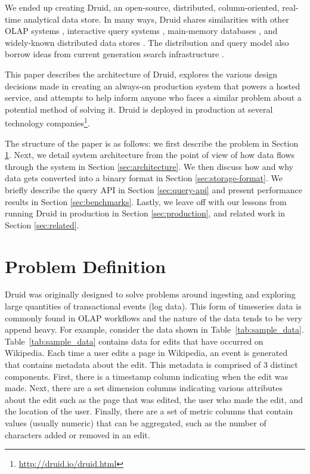 \documentclass{sig-alternate-2013}
\begin{document}
We ended up creating Druid, an open-source, distributed, column-oriented,
real-time analytical data store.  In many ways, Druid shares similarities with
other OLAP systems \cite{oehler2012ibm, schrader2009oracle, lachev2005applied},
interactive query systems \cite{melnik2010dremel}, main-memory databases
\cite{farber2012sap}, and widely-known distributed data stores
\cite{chang2008bigtable, decandia2007dynamo, lakshman2010cassandra}.  The
distribution and query model also borrow ideas from current generation search
infrastructure \cite{linkedin2013senseidb, apache2013solr,
banon2013elasticsearch}.

This paper describes the architecture of Druid, explores the various design
decisions made in creating an always-on production system that powers a hosted
service, and attempts to help inform anyone who faces a similar problem about a
potential method of solving it. Druid is deployed in production at several
technology
companies\footnote{\href{http://druid.io/druid.html}{http://druid.io/druid.html}}.

The structure of the paper is as follows: we first describe the problem in
Section \ref{sec:problem-definition}.  Next, we detail system architecture from
the point of view of how data flows through the system in Section
\ref{sec:architecture}.  We then discuss how and why data gets converted into a
binary format in Section \ref{sec:storage-format}.  We briefly describe the
query API in Section \ref{sec:query-api} and present performance results
in Section \ref{sec:benchmarks}. Lastly, we leave off with our lessons from
running Druid in production in Section \ref{sec:production}, and related work
in Section \ref{sec:related}.

\section{Problem Definition}
\label{sec:problem-definition}

Druid was originally designed to solve problems around ingesting and exploring
large quantities of transactional events (log data). This form of timeseries
data is commonly found in OLAP workflows and the nature of the data tends to be
very append heavy. For example, consider the data shown in
Table~\ref{tab:sample_data}.  Table~\ref{tab:sample_data} contains data for
edits that have occurred on Wikipedia. Each time a user edits a page in
Wikipedia, an event is generated that contains metadata about the edit. This
metadata is comprised of 3 distinct components. First, there is a timestamp
column indicating when the edit was made. Next, there are a set dimension
columns indicating various attributes about the edit such as the page that was
edited, the user who made the edit, and the location of the user. Finally,
there are a set of metric columns that contain values (usually numeric) that
can be aggregated, such as the number of characters added or removed in an
edit. 
\end{document}
